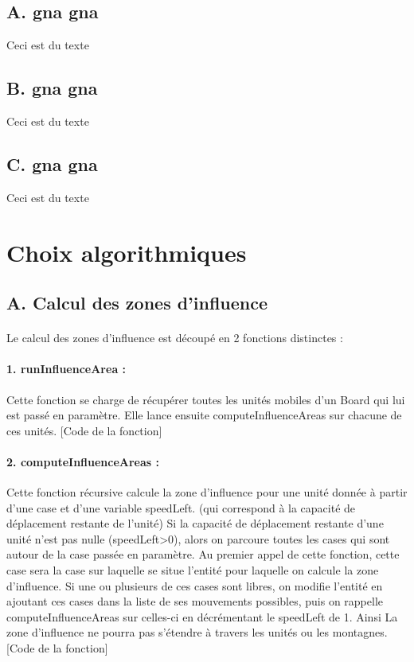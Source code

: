 \documentclass[12pt]{article}
\begin{document}
		\subsection{ A. gna gna}
		
		Ceci est du texte
		
		\subsection{ B. gna gna}
		
		Ceci est du texte
		
		\subsection{ C. gna gna}
		
		Ceci est du texte
		
		\clearpage	
		
	\section{Choix algorithmiques}    

		\subsection{A. Calcul des zones d'influence}
		
		\paragraph{}
		Le calcul des zones d'influence est découpé en 2 fonctions distinctes :
		
		\paragraph{1. runInfluenceArea : }
		Cette fonction se charge de récupérer toutes les unités mobiles d'un Board qui lui est passé en paramètre.
		Elle lance ensuite computeInfluenceAreas sur chacune de ces unités.
		[Code de la fonction]
		
		\paragraph{2. computeInfluenceAreas : }
		Cette fonction récursive calcule la zone d'influence pour une unité donnée à partir d'une case et d'une variable speedLeft. 
		(qui correspond à la capacité de déplacement restante de l'unité)
		Si la capacité de déplacement restante d'une unité n'est pas nulle (speedLeft>0), alors on parcoure toutes les cases 
		qui sont autour de la case passée en paramètre. 
		Au premier appel de cette fonction, cette case sera la case sur laquelle se situe l'entité pour laquelle on calcule la zone d'influence.
		Si une ou plusieurs de ces cases sont libres, on modifie l'entité en ajoutant ces cases dans la liste de ses mouvements possibles, 
		puis on rappelle computeInfluenceAreas sur celles-ci en décrémentant le speedLeft de 1.
		Ainsi La zone d'influence ne pourra pas s'étendre à travers les unités ou les montagnes.
		[Code de la fonction]
		
\end{document}
